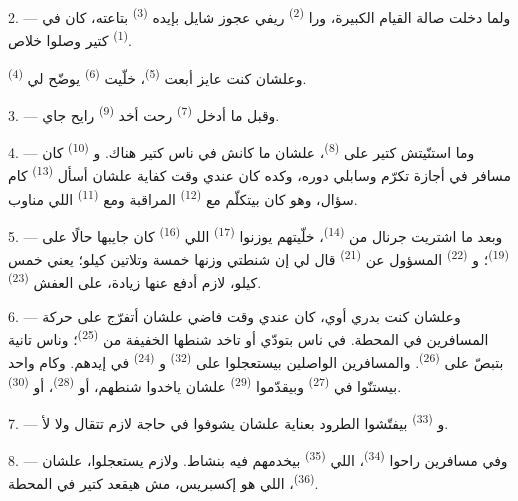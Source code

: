2. --- ولما دخلت صالة القيام الكبيرة، ورا  \textsuperscript{(2)} ريفي
عجوز شايل بإيده  \textsuperscript{(3)} بتاعته، كان في
 \textsuperscript{(1)} كتير وصلوا خلاص.

وعلشان كنت عايز أبعت  \textsuperscript{(5)}، خلّيت 
\textsuperscript{(6)} يوضّح لي  \textsuperscript{(4)}.

3. --- وقبل ما أدخل  \textsuperscript{(7)} رحت أخد
 \textsuperscript{(9)} رايح جاي.

4. --- وما استنّيتش كتير على  \textsuperscript{(8)}، علشان ما كانش
في ناس كتير هناك. و \textsuperscript{(10)} كان مسافر في أجازة تكرّم
وسابلي دوره، وكده كان عندي وقت كفاية علشان أسأل 
\textsuperscript{(13)} كام سؤال، وهو كان بيتكلّم مع  \textsuperscript{(12)}
المراقبة ومع  \textsuperscript{(11)} اللي مناوب.

\VUsaut{3.0mm}

5. --- وبعد ما اشتريت جرنال من  \textsuperscript{(14)}، خلّيتهم
يوزنوا  \textsuperscript{(17)} اللي  \textsuperscript{(16)}
كان جايبها حالًا على  \textsuperscript{(19)}؛ و
\textsuperscript{(22)} المسؤول عن  \textsuperscript{(21)} قال لي إن شنطتي
وزنها خمسة وتلاتين كيلو؛ يعني  خمس كيلو، لازم أدفع عنها زيادة، على
 العفش \textsuperscript{(23)}.

6. --- وعلشان كنت بدري أوي، كان عندي وقت فاضي علشان أتفرّج على حركة المسافرين
في المحطة. في ناس بتودّي أو تاخد شنطها الخفيفة من 
\textsuperscript{(25)}؛ وناس تانية بتبصّ على 
\textsuperscript{(26)}. والمسافرين الواصلين بيستعجلوا على 
\textsuperscript{(32)} و \textsuperscript{(24)} في إيدهم. وكام واحد
بيستنّوا في  \textsuperscript{(27)} وبيقدّموا
 \textsuperscript{(29)} علشان ياخدوا شنطهم، أو 
\textsuperscript{(28)}، أو  \textsuperscript{(30)}.

7. --- و \textsuperscript{(33)} بيفتّشوا الطرود بعناية علشان
يشوفوا في حاجة لازم تتقال ولا لأ.

8. --- وفي مسافرين راحوا  \textsuperscript{(34)}، اللي
 \textsuperscript{(35)} بيخدمهم فيه بنشاط. ولازم يستعجلوا، علشان
 \textsuperscript{(36)}، اللي هو إكسبريس، مش هيقعد كتير في المحطة.

